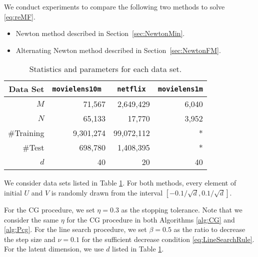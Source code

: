 \label{sec:exp}
We conduct experiments to compare the following two methods to solve \eqref{eq:reMF}.
\begin{itemize}
\item Newton method described in Section~\ref{sec:NewtonMin}.
\item Alternating Newton method \citep{WSC18a} described in Section~\ref{sec:NewtonFM}.
\end{itemize}
\begin{table}[H]
\caption{Statistics and parameters for each data set.}
\centering
\begin{tabular}{r|rrr}
Data Set   & \tt movielens10m & \tt netflix  & \tt movielens1m\\ \hline
$M$          & 71,567        & 2,649,429  & 6,040\\
$N$          & 65,133        & 17,770    & 3,952\\
\#Training & 9,301,274      & 99,072,112 & *\\
\#Test     & 698,780       & 1,408,395 & *\\
$d$				& 40					& 20			& 40
\end{tabular}
\label{tab:dataset}
\end{table}
We consider data sets listed in Table \ref{tab:dataset}. For both methods, every element of initial $U$ and $V$ is randomly drawn from the interval $[-0.1/\sqrt{d},{0.1}/\sqrt{d}]$. 
\par For the CG procedure, we set $\eta=0.3$ as the stopping tolerance. Note that we consider the same $\eta$ for the CG procedure in both Algorithms \ref{alg:CG} and \ref{alg:Pcg}. For the line search procedure, we set $\beta=0.5$ as the ratio to decrease the step size and $\nu=0.1$ for the sufficient decrease condition \eqref{eq:LineSearchRule}. For the latent dimension, we use $d$ listed in Table \ref{tab:dataset}.

